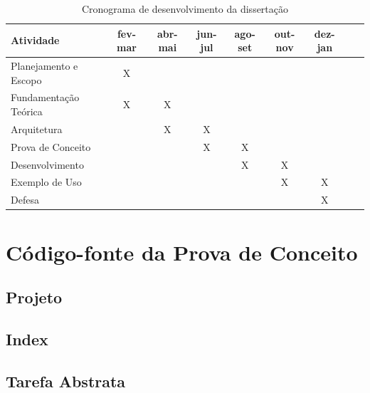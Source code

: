 \documentclass[12pt]{tcc}
\begin{document}
\begin{table}[!ht]
	\centering
	\caption{Cronograma de desenvolvimento da dissertação}
	\begin{tabular}{l  c  c  c  c  c  c L{1.5cm} R{1.5cm}}
		\toprule
		\textbf{Atividade} & \textbf{fev-mar} & \textbf{abr-mai} & \textbf{jun-jul} & \textbf{ago-set} & \textbf{out-nov} & \textbf{dez-jan} \\
		\midrule
		Planejamento e Escopo  &  X  &    &    &    &    &    \\
		Fundamentação Teórica  &  X  &  X  &    &    &    &    \\
		Arquitetura  &    &  X  &  X  &    &    &    \\
		Prova de Conceito  &    &    &  X  &  X  &    &    \\
		Desenvolvimento  &    &    &    &  X  &  X  &    \\
		Exemplo de Uso  &    &    &    &    &  X  &  X  \\
		Defesa  &    &    &    &    &    &  X  \\
		\bottomrule
	\end{tabular}
	\label{tab:cronograma}
\end{table}

\label{bibpage}
\renewcommand\bibname{Referências}

%

\label{bibfinalpage}

\label{lastpage}

\appendix
\chapter{Código-fonte da Prova de Conceito}

\section{Projeto}


\section{Index}


\section{Tarefa Abstrata}

\end{document}
